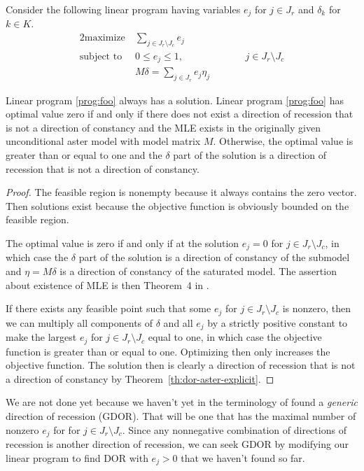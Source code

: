 Consider the following linear program having variables $e_j$
for $j \in J_r$ and $\delta_k$ for $k \in K$.
\begin{alignat}{2}
  \text{maximize}   & \ \sum_{j \in J_r \setminus J_c} e_j
  \nonumber
  \\
  \text{subject to} & \ 0 \le e_j \le 1, & \qquad & j \in J_r \setminus J_c
  \label{prog:foo}
  \\
                    & \ M \delta =
  \sum_{j \in J_r} e_j \eta_j
  \nonumber
\end{alignat}
\begin{theorem} \label{th:lin-prog-one}
Linear program \eqref{prog:foo} always has a solution.
Linear program \eqref{prog:foo} has optimal value zero if and only if
there does
not exist a direction of recession that is not a direction of constancy
and the MLE exists in the originally given unconditional aster model
with model matrix $M$.
Otherwise, the optimal value is greater than or equal to one and the
$\delta$ part of the solution is a direction of recession that is not
a direction of constancy.
\end{theorem}
\begin{proof}
The feasible region is nonempty because it always contains the zero vector.
Then solutions exist because the objective function is obviously bounded
on the feasible region.

The optimal value is zero if and only if at the solution $e_j = 0$ for
$j \in J_r \setminus J_c$, in which case the $\delta$ part of the solution
is a direction of constancy of the submodel and $\eta = M \delta$ is a
direction of constancy of the saturated model.  The assertion about
existence of MLE is then Theorem~{4} in \citet{geyer-gdor}.

If there exists any feasible point such that some $e_j$
for $j \in J_r \setminus J_c$ is nonzero, then we can multiply all components
of $\delta$ and all $e_j$ by a strictly positive constant to make
the largest $e_j$ for $j \in J_r \setminus J_c$ equal to one, in which case
the objective function is greater than or equal to one.
Optimizing then only increases the objective function.
The solution then is clearly a direction of recession that is not a
direction of constancy by Theorem~\ref{th:dor-aster-explicit}.
\end{proof}

We are not done yet because we haven't yet in the terminology of
\citet{geyer-gdor} found a \emph{generic} direction of recession (GDOR).
That will be one that has the maximal number of nonzero $e_j$ for
for $j \in J_r \setminus J_c$.  Since any nonnegative combination of
directions of recession is another direction of recession, we can
seek GDOR by modifying our linear program to find DOR with $e_j > 0$
that we haven't found so far.

